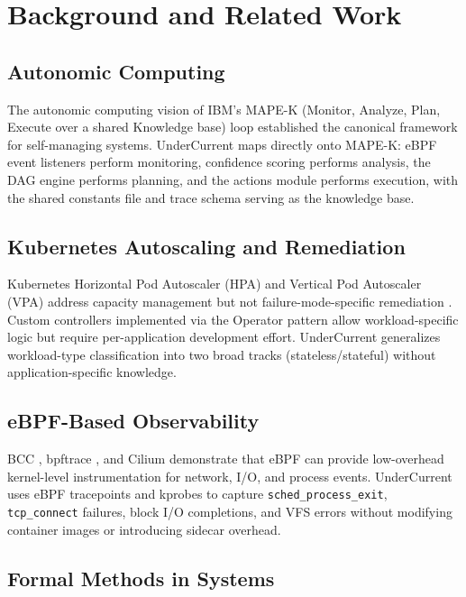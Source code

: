 \documentclass[runningheads]{llncs}
\begin{document}
\section{Background and Related Work}
\label{sec:background}

\subsection{Autonomic Computing}

The autonomic computing vision of IBM's MAPE-K (Monitor, Analyze, Plan,
Execute over a shared Knowledge base) loop \cite{kephart2003vision}
established the canonical framework for self-managing systems.
UnderCurrent maps directly onto MAPE-K: eBPF event listeners perform
monitoring, confidence scoring performs analysis, the DAG engine
performs planning, and the actions module performs execution, with
the shared constants file and trace schema serving as the knowledge base.

\subsection{Kubernetes Autoscaling and Remediation}

Kubernetes Horizontal Pod Autoscaler (HPA) and Vertical Pod Autoscaler
(VPA) address capacity management but not failure-mode-specific
remediation \cite{burns2016borg}. Custom controllers implemented via the
Operator pattern \cite{dobies2020kubernetes} allow workload-specific
logic but require per-application development effort.
UnderCurrent generalizes workload-type classification into two broad
tracks (stateless/stateful) without application-specific knowledge.

\subsection{eBPF-Based Observability}

BCC \cite{bcc2016}, bpftrace \cite{bpftrace2019}, and Cilium
\cite{cilium2018} demonstrate that eBPF can provide low-overhead
kernel-level instrumentation for network, I/O, and process events.
UnderCurrent uses eBPF tracepoints and kprobes to capture
\texttt{sched\_process\_exit}, \texttt{tcp\_connect} failures,
block I/O completions, and VFS errors without modifying container
images or introducing sidecar overhead.

\subsection{Formal Methods in Systems}
\end{document}
